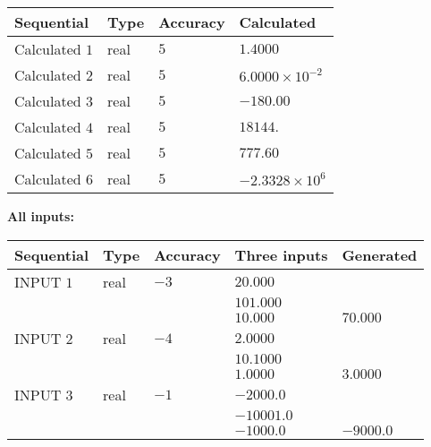 \documentclass[12pt]{article}
\begin{document}
  
\noindent\begin{tabular}{|l|l|l|l|}
\hline
 Sequential & Type & Accuracy & Calculated \\ 
\hline
 
 
  Calculated $            1 $ & real & $            5  $ & 
 $ 1.4000 $ 
 \\  \hline  
 
 
  Calculated $            2 $ & real & $            5  $ & 
 $ 6.0000 \times 10^{-2} $ 
 \\  \hline  
 
 
  Calculated $            3 $ & real & $            5  $ & 
 $ -180.00 $ 
 \\  \hline  
 
 
  Calculated $            4 $ & real & $            5  $ & 
 $ 18144. $ 
 \\  \hline  
 
 
  Calculated $            5 $ & real & $            5  $ & 
 $ 777.60 $ 
 \\  \hline  
 
 
  Calculated $            6 $ & real & $            5  $ & 
 $ -2.3328 \times 10^{6} $ 
 \\  \hline  
 \end{tabular}
   
   
   
   
\noindent\vspace{0.1in}\hspace{-0.08in} {\textbf{\Large{All inputs: }}}
   
   
  
  
\noindent\begin{tabular}{|l|l|l|l|l|}
\hline
 Sequential & Type & Accuracy & Three inputs & Generated \\ 
\hline
 
 
  INPUT $            1 $ & real & $           -3  $ & $
 20.000
  $ & \\
  & & &  $
 101.000
  $ & \\
  & & &  $
 10.000
 $ & $ 70.000 $ 
 \\  \hline  
 
 
  INPUT $            2 $ & real & $           -4  $ & $
 2.0000
  $ & \\
  & & &  $
 10.1000
  $ & \\
  & & &  $
 1.0000
 $ & $ 3.0000 $ 
 \\  \hline  
 
 
  INPUT $            3 $ & real & $           -1  $ & $
 -2000.0
  $ & \\
  & & &  $
 -10001.0
  $ & \\
  & & &  $
 -1000.0
 $ & $ -9000.0 $ 
 \\  \hline  
 \end{tabular}
   
\end{document}

